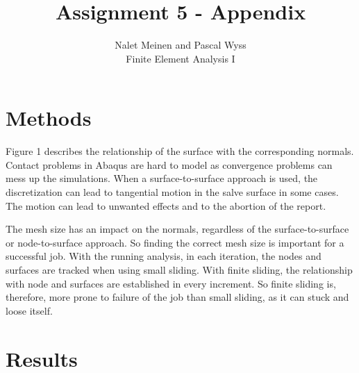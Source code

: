 \documentclass[12pt]{article}
\begin{document}


\title{Assignment 5 - Appendix}%
\author{Nalet Meinen and Pascal Wyss\\ %
Finite Element Analysis I
}
\maketitle

\section{Methods}


Figure 1 describes the relationship of the surface with the corresponding normals. Contact problems in Abaqus are hard to model as convergence problems can mess up the simulations. When a surface-to-surface approach is used, the discretization can lead to tangential motion in the salve surface in some cases. The motion can lead to unwanted effects and to the abortion of the report.


The mesh size has an impact on the normals, regardless of the surface-to-surface or node-to-surface approach. So finding the correct mesh size is important for a successful job. With the running analysis, in each iteration, the nodes and surfaces are tracked when using small sliding. With finite sliding, the relationship with node and surfaces are established in every increment. So finite sliding is, therefore, more prone to failure of the job than small sliding, as it can stuck and loose itself.
\newpage

\section{Results}
\end{document}
